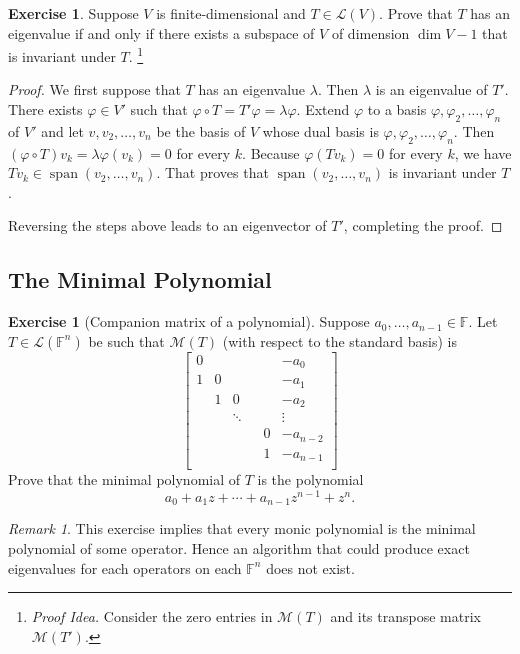 \documentclass[nofonts,colorlinks]{tufte-handout}
\theoremstyle{plain} %
\newtheorem{prop}[thm]{Proposition}
\theoremstyle{definition}
\newtheorem{exer}[thm]{Exercise}
\theoremstyle{remark}
\newtheorem{rmk}[thm]{Remark}
\def\idea{\textit{\color[rgb]{0,0,.55}Proof Idea. }}
\renewcommand{\phi}{\varphi}
\newcommand{\F}{\mathbb{F}}
\renewcommand{\L}{\mathcal{L}}
\newcommand{\M}{\mathcal{M}}
\renewcommand{\P}{\mathcal{P}}
\DeclareMathOperator{\spn}{span}
\begin{document}
\begin{exer}
	Suppose $V$ is finite-dimensional and $T\in\L(V)$. Prove that $T$ has an eigenvalue if and only if there exists a subspace of $V$ of dimension $\dim V-1$ that is invariant under $T$.%
	\footnote{\idea Consider the zero entries in $\M(T)$ and its transpose matrix $\M(T')$.}
\end{exer}
\begin{proof}
	We first suppose that $T$ has an eigenvalue $\lambda$. Then $\lambda$ is an eigenvalue of $T'$. There exists $\phi\in V'$ such that $\phi\circ T=T'\phi=\lambda\phi$. Extend $\phi$ to a basis $\phi,\phi_2,\dots,\phi_n$ of $V'$ and let $v,v_2,\dots,v_n$ be the basis of $V$ whose dual basis is $\phi,\phi_2,\dots,\phi_n$. Then $(\phi\circ T)v_k=\lambda\phi(v_k)=0$ for every $k$. Because $\phi(T v_k)=0$ for every $k$, we have $Tv_k\in\spn(v_2,\dots,v_n)$. That proves that $\spn(v_2,\dots,v_n)$ is invariant under $T$.
	
	Reversing the steps above leads to an eigenvector of $T'$, completing the proof.
\end{proof}


\subsection{The Minimal Polynomial}
\begin{exer}[Companion matrix of a polynomial]
	Suppose $a_0,\dots,a_{n-1}\in\F$. Let $T\in\L(\F^n)$ be such that $\M(T)$ (with respect to the standard basis) is
	\[\begin{bmatrix}
		0&&&&&-a_0\\
		1&0&&&&-a_1\\
		&1&0&&&-a_2\\
		&&\ddots&&&\vdots\\
		&&&&0&-a_{n-2}\\
		&&&&1&-a_{n-1}\\
	\end{bmatrix}\]
	Prove that the minimal polynomial of $T$ is the polynomial
	\[a_0+a_1z+\cdots+a_{n-1}z^{n-1}+z^n.\]
\end{exer}

\begin{rmk}
	This exercise implies that every monic polynomial is the minimal polynomial of some operator. Hence an algorithm that could produce exact eigenvalues for each operators on each $\F^n$ does not exist.
\end{rmk}

\end{document}
